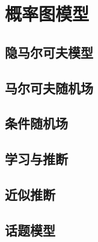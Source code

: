 \newpage
\section{概率图模型}
\subsection{隐马尔可夫模型}
\subsection{马尔可夫随机场}
\subsection{条件随机场}
\subsection{学习与推断}
\subsection{近似推断}
\subsection{话题模型}